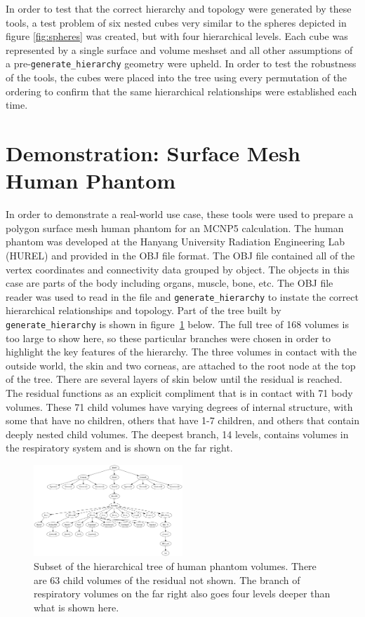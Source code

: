 \documentclass{anstrans}
\begin{document}
In order to test that the correct hierarchy and topology were generated
by these tools, a test problem of six nested cubes very similar to the spheres
depicted in figure \ref{fig:spheres} was created, but with four hierarchical
levels.  Each cube was represented by a single surface and volume meshset and
all other assumptions of a pre-\texttt{generate\_hierarchy} geometry were
upheld.  In order to test the robustness of the tools, the cubes were placed
into the tree using every permutation of the ordering to confirm that the same
hierarchical relationships were established each time.

\section{Demonstration: Surface Mesh Human Phantom}

In order to demonstrate a real-world use case, these tools were used to
prepare a polygon surface mesh human phantom for an MCNP5 calculation.  The
human phantom was developed at the Hanyang University Radiation Engineering Lab (HUREL) and provided in the OBJ file
format.  The OBJ file contained all of the vertex coordinates
and connectivity data grouped by object.  The objects in this case are parts
of the body including organs, muscle, bone, etc.  The OBJ file reader was used
to read in the file and \texttt{generate\_hierarchy} to instate the correct
hierarchical relationships and topology.  Part of the tree built by \texttt{generate\_hierarchy}
is shown in figure~\ref{fig:trimtree} below.  The full tree of 168 volumes is too large to
show here, so these particular branches were chosen in order to highlight the key features of the 
hierarchy.  The three volumes in contact with the outside
world, the skin and two corneas, are attached to the root node at the top of the tree.  
There are several layers of skin below until the residual is reached. The residual
functions as an explicit compliment that is in contact with 71 body volumes.
These 71 child volumes have varying degrees of internal structure, with some that have no children,
others that have 1-7 children, and others that contain deeply nested child volumes.  The deepest branch, 14 levels,
contains volumes in the respiratory system and is shown on the far right.

\begin{figure}[ht]
 \centering
 \includegraphics[width=0.5\textwidth]{../figs/trimtree.png}
 \caption{Subset of the hierarchical tree of human phantom volumes.  
          There are 63 child volumes of the residual not shown. 
          The branch of respiratory volumes on the far right also goes
          four levels deeper than what is shown here.}
 \label{fig:trimtree}
\end{figure}
\end{document}
